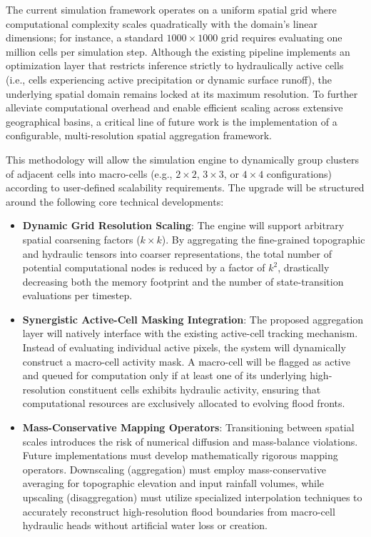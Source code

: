 The current simulation framework operates on a uniform spatial grid where computational complexity scales quadratically 
with the domain's linear dimensions; for instance, a standard $1000 \times 1000$ grid requires evaluating one million 
cells per simulation step. Although the existing pipeline implements an optimization layer that restricts inference strictly 
to hydraulically active cells (i.e., cells experiencing active precipitation or dynamic surface runoff), the underlying 
spatial domain remains locked at its maximum resolution. To further alleviate computational overhead and enable efficient 
scaling across extensive geographical basins, a critical line of future work is the implementation of a configurable, 
multi-resolution spatial aggregation framework.

This methodology will allow the simulation engine to dynamically group clusters of adjacent cells into macro-cells (e.g., 
$2\times2$, $3\times3$, or $4\times4$ configurations) according to user-defined scalability requirements. The upgrade will 
be structured around the following core technical developments:

\begin{itemize}
	\item \textbf{Dynamic Grid Resolution Scaling}: The engine will support arbitrary spatial coarsening factors ($k \times k$). 
	By aggregating the fine-grained topographic and hydraulic tensors into coarser representations, the total number of potential 
	computational nodes is reduced by a factor of $k^2$, drastically decreasing both the memory footprint and the number of 
	state-transition evaluations per timestep.
	
	\item \textbf{Synergistic Active-Cell Masking Integration}: The proposed aggregation layer will natively interface with the 
	existing active-cell tracking mechanism. Instead of evaluating individual active pixels, the system will dynamically construct 
	a macro-cell activity mask. A macro-cell will be flagged as active and queued for computation only if at least one of its 
	underlying high-resolution constituent cells exhibits hydraulic activity, ensuring that computational resources are exclusively 
	allocated to evolving flood fronts.
	
	\item \textbf{Mass-Conservative Mapping Operators}: Transitioning between spatial scales introduces the risk of numerical 
	diffusion and mass-balance violations. Future implementations must develop mathematically rigorous mapping operators. 
	Downscaling (aggregation) must employ mass-conservative averaging for topographic elevation and input rainfall volumes, while 
	upscaling (disaggregation) must utilize specialized interpolation techniques to accurately reconstruct high-resolution flood 
	boundaries from macro-cell hydraulic heads without artificial water loss or creation.
\end{itemize}


